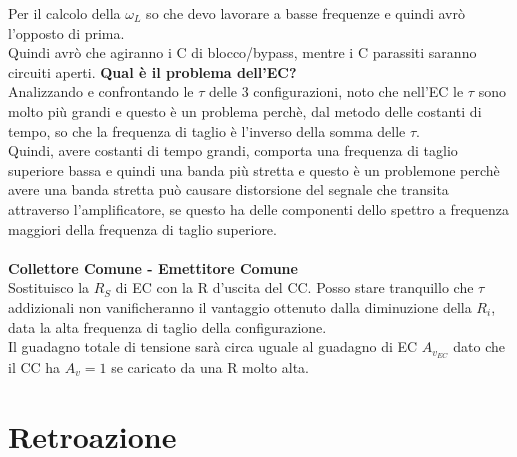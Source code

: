 \documentclass{article}
\begin{document}
Per il calcolo della $ \omega_{L} $
so che devo lavorare a basse frequenze e quindi avrò l'opposto di prima.\\ Quindi avrò che agiranno i C di blocco/bypass, mentre i C parassiti saranno circuiti aperti.
\newpage
\noindent
\textbf{Qual è il problema dell'EC?} \\
Analizzando e confrontando le $ \tau $ delle 3 configurazioni, noto che nell'EC le $ \tau $ sono molto più grandi e questo è un problema perchè, dal metodo delle costanti di tempo, so che la frequenza di taglio è l'inverso della somma delle $ \tau.$ \\
Quindi, avere costanti di tempo grandi, comporta una frequenza di taglio superiore bassa e quindi una banda più stretta e questo è un problemone perchè avere una banda stretta può causare distorsione del segnale che transita attraverso l'amplificatore, se questo ha delle componenti dello spettro a frequenza maggiori della frequenza di taglio superiore. \\ \\
\textbf{Collettore Comune - Emettitore Comune}\\
Sostituisco la $R_{S}$ di EC con la R d'uscita del CC.
Posso stare tranquillo che $\tau$ addizionali non vanificheranno il vantaggio ottenuto dalla diminuzione della $R_{i}$, data la alta frequenza di taglio della configurazione.\\
Il guadagno totale di tensione sarà circa uguale al guadagno di EC $A_{v_{EC}}$  dato che il CC ha $A_{v}=1$ se caricato da una R molto alta.

\newpage
\section{Retroazione}
\end{document}
